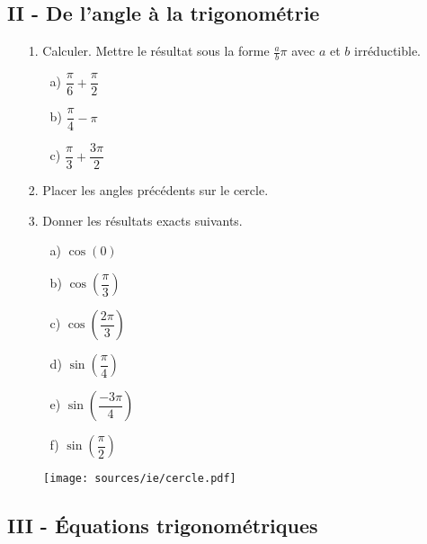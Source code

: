 \documentclass[12pt]{article}
\begin{document}
\subsection*{II - De l'angle à la trigonométrie}
\setlength{\columnseprule}{1pt}
\begin{multicols}{2}

  \begin{enumerate}
  \item[1.] Calculer. Mettre le résultat sous la forme $\frac{a}{b}\pi$ avec $a$ et $b$ irréductible.

    \begin{enumerate}
    \item[a)] $\dfrac{\pi}{6} + \dfrac{\pi}{2}$
    \item[b)] $\dfrac{\pi}{4} - \pi$
    \item[c)] $\dfrac{\pi}{3} + \dfrac{3\pi}{2}$
    \end{enumerate}

  \item[2.] Placer les angles précédents sur le cercle.
  \item[3.] Donner les résultats exacts suivants. 
    \setlength{\columnseprule}{0pt}
    \begin{multicols}{2}
      \begin{enumerate}
      \item[a)] $\cos(0)$
      \item[b)] $\cos(\dfrac{\pi}{3})$
      \item[c)] $\cos(\dfrac{2\pi}{3})$
      \item[d)] $\sin(\dfrac{\pi}{4})$
      \item[e)] $\sin(\dfrac{-3\pi}{4})$
      \item[f)] $\sin(\dfrac{\pi}{2})$
      \end{enumerate}
    \end{multicols}

  \end{enumerate}

  \begin{figure}[H]
    \centering
    \texttt{[image: sources/ie/cercle.pdf]}
  \end{figure}
\end{multicols}
\subsection*{III - Équations trigonométriques}
\end{document}
